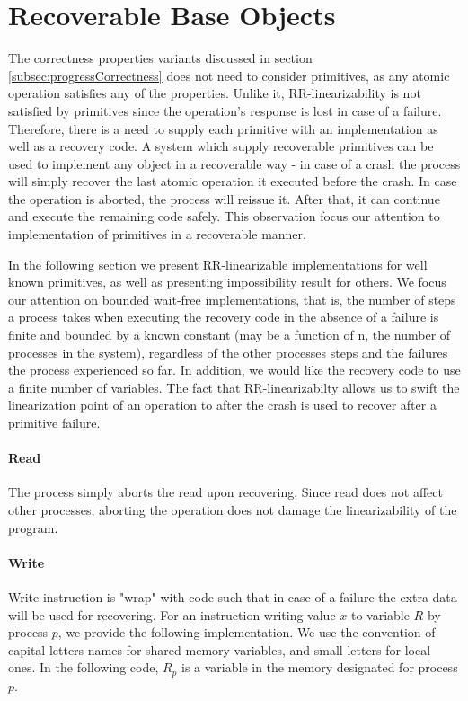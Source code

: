 
\section{Recoverable Base Objects}
\label{section: Recoverable Base Objects}

The correctness properties variants discussed in section \ref{subsec:progressCorrectness} does not need to consider primitives, as any atomic operation satisfies any of the properties. Unlike it, RR-linearizability is not satisfied by primitives since the operation's response is lost in case of a failure. Therefore, there is a need to supply each primitive with an implementation as well as a recovery code. A system which supply recoverable primitives can be used to implement any object in a recoverable way - in case of a crash the process will simply recover the last atomic operation it executed before the crash. In case the operation is aborted, the process will reissue it. After that, it can continue and execute the remaining code safely. This observation focus our attention to implementation of primitives in a recoverable manner.

In the following section we present RR-linearizable implementations for well known primitives, as well as presenting impossibility result for others. We focus our attention on bounded wait-free implementations, that is, the number of steps a process takes when executing the recovery code in the absence of a failure is finite and bounded by a known constant (may be a function of n, the number of processes in the system), regardless of the other processes steps and the failures the process experienced so far. In addition, we would like the recovery code to use a finite number of variables.
The fact that RR-linearizabilty allows us to swift the linearization point of an operation to after the crash is used to recover after a primitive failure.

\paragraph*{Read}

The process simply aborts the read upon recovering. Since read does not affect other processes, aborting the operation does not damage the linearizability of the program.

\paragraph*{Write}
Write instruction is "wrap" with code such that in case of a failure the extra data will be used for recovering. For an instruction writing value $x$ to variable $R$ by process $p$, we provide the following implementation. We use the convention of capital letters names for shared memory variables, and small letters for local ones. In the following code, $R_p$ is a variable in the memory designated for process $p$.

